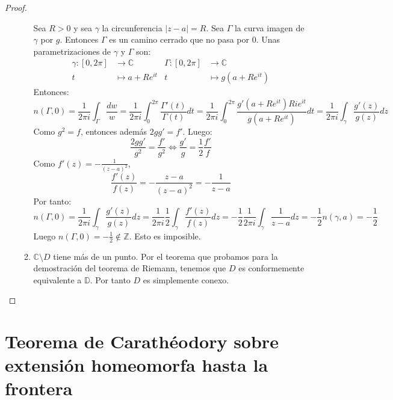 \begin{proof}
\begin{itemize}
\begin{enumerate}
                      Sea $R > 0$ y sea $\gamma$ la circunferencia $|z-a| = R$.
                      Sea $\Gamma$ la curva imagen de $\gamma$ por $g$.
                      Entonces $\Gamma$ es un camino cerrado que no pasa por 0.
                      Unas parametrizaciones de $\gamma$ y $\Gamma$ son:
                      \begin{align*}
                          \gamma: [0, 2\pi] & \to \mathbb{C}      & \Gamma: [0, 2\pi] & \to \mathbb{C}         \\
                          t                 & \mapsto a + Re^{it} & t                 & \mapsto g(a + Re^{it})
                      \end{align*}
                      Entonces:
                      $$n(\Gamma, 0) = \frac{1}{2\pi i} \int_\Gamma \frac{dw}{w} = \frac{1}{2\pi i} \int_0^{2\pi} \frac{\Gamma'(t)}{\Gamma(t)}dt = \frac{1}{2\pi i} \int_0^{2\pi} \frac{g'(a + Re^{it})Rie^{it}}{g(a + Re^{it})}dt = \frac{1}{2\pi i} \int_\gamma \frac{g'(z)}{g(z)}dz$$
                      Como $g^2 = f$, entonces además $2gg' = f'$.
                      Luego:
                      $$\frac{2gg'}{g^2} = \frac{f'}{g^2} \Leftrightarrow \frac{g'}{g} = \frac{1}{2}\frac{f'}{f}$$
                      Como $f'(z) = -\frac{1}{(z-a)^2}$,
                      $$\frac{f'(z)}{f(z)} = -\frac{z-a}{(z-a)^2} = -\frac{1}{z-a}$$
                      Por tanto:
                      $$n(\Gamma, 0) = \frac{1}{2\pi i} \int_\gamma \frac{g'(z)}{g(z)}dz = \frac{1}{2\pi i}\frac{1}{2} \int_\gamma \frac{f'(z)}{f(z)}dz = -\frac{1}{2}\frac{1}{2\pi i} \int_\gamma \frac{1}{z-a}dz = -\frac{1}{2}n(\gamma, a) = -\frac{1}{2}$$
                      Luego $n(\Gamma, 0) = -\frac{1}{2} \notin \mathbb{Z}$.
                      Esto es imposible.

                \item $\mathbb{C} \setminus D$ tiene más de un punto.
                      Por el teorema que probamos para la demostración del teorema de Riemann, tenemos que $D$ es conformemente equivalente a $\mathbb{D}$.
                      Por tanto $D$ es simplemente conexo.
            \end{enumerate}
    \end{itemize}
\end{proof}

\section{Teorema de Carathéodory sobre extensión homeomorfa hasta la frontera}

